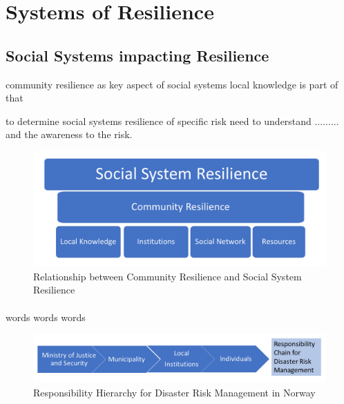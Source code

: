 \section{Systems of Resilience }

\subsection{Social Systems impacting Resilience}
community resilience as key aspect of social systems
local knowledge is part of that

to determine social systems resilience of specific risk need to understand ......... and the awareness to the risk. 

\begin{figure}[h]
    \centering
    \includegraphics[width=1\textwidth]{fig_theory/social system hierarchy.png}
    \caption{Relationship between Community Resilience and Social System Resilience}
    \label{fig:social_resilience}
\end{figure}
\paragraph{}


words words words
\begin{figure} [h]
    \centering
    \includegraphics[width=1\textwidth]{fig_theory/responsibility drm.png}
    \caption{Responsibility Hierarchy for Disaster Risk Management in Norway}
    \label{fig:drm_responsibility}
\end{figure}
\paragraph{}

